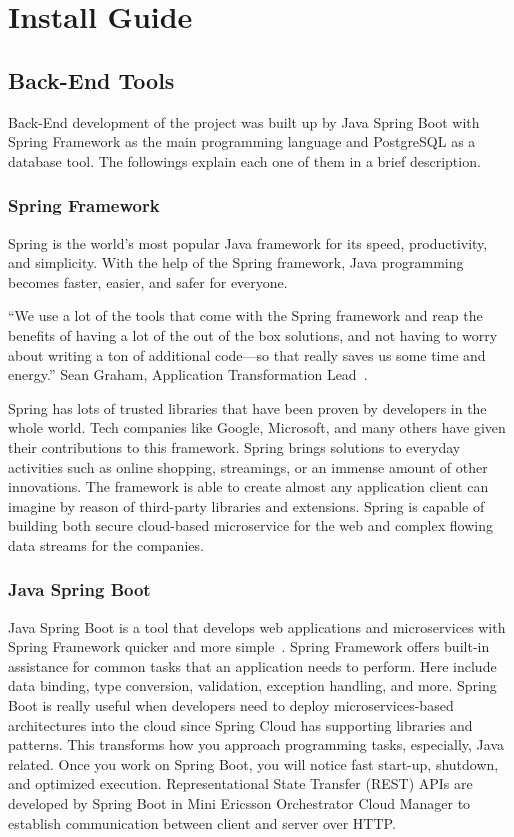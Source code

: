 \section{Install Guide}
\label{sec:install-guide}

\subsection{Back-End Tools}
Back-End development of the project was built up by Java Spring Boot with Spring Framework as the main programming language and PostgreSQL as a database tool. The followings explain each one of them in a brief description.

\subsubsection{Spring Framework}
Spring is the world's most popular Java framework for its speed, productivity, and simplicity. With the help of the Spring framework, Java programming becomes faster, easier, and safer for everyone.

``We use a lot of the tools that come with the Spring framework and reap the benefits of having a lot of the out of the box solutions, and not having to worry about writing a ton of additional code—so that really saves us some time and energy.'' Sean Graham,  Application Transformation Lead~\cite{why-spring}.

Spring has lots of trusted libraries that have been proven by developers in the whole world. Tech companies like Google, Microsoft, and many others have given their contributions to this framework. Spring brings solutions to everyday activities such as online shopping, streamings, or an immense amount of other innovations. The framework is able to create almost any application client can imagine by reason of third-party libraries and extensions. Spring is capable of building both secure cloud-based microservice for the web and complex flowing data streams for the companies.

\subsubsection{Java Spring Boot}
Java Spring Boot is a tool that develops web applications and microservices with Spring Framework quicker and more simple~\cite{java-spring-boot}. Spring Framework offers built-in assistance for common tasks that an application needs to perform. Here include data binding, type conversion, validation, exception handling, and more. Spring Boot is really useful when developers need to deploy microservices-based architectures into the cloud since Spring Cloud has supporting libraries and patterns. This transforms how you approach programming tasks, especially, Java related. Once you work on Spring Boot, you will notice fast start-up, shutdown, and optimized execution. Representational State Transfer (REST) APIs are developed by Spring Boot in Mini Ericsson Orchestrator Cloud Manager to establish communication between client and server over HTTP.

